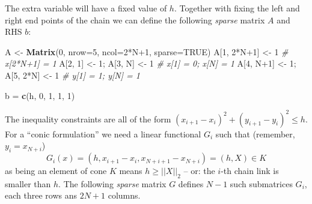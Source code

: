 \documentclass[]{article}
\newenvironment{Shaded}{\begin{snugshade}}{\end{snugshade}}
\newcommand{\KeywordTok}[1]{\textcolor[rgb]{0.13,0.29,0.53}{\textbf{{#1}}}}
\newcommand{\DataTypeTok}[1]{\textcolor[rgb]{0.13,0.29,0.53}{{#1}}}
\newcommand{\DecValTok}[1]{\textcolor[rgb]{0.00,0.00,0.81}{{#1}}}
\newcommand{\StringTok}[1]{\textcolor[rgb]{0.31,0.60,0.02}{{#1}}}
\newcommand{\CommentTok}[1]{\textcolor[rgb]{0.56,0.35,0.01}{\textit{{#1}}}}
\newcommand{\OtherTok}[1]{\textcolor[rgb]{0.56,0.35,0.01}{{#1}}}
\newcommand{\NormalTok}[1]{{#1}}
\begin{document}
The extra variable will have a fixed value of \(h\). Together with
fixing the left and right end points of the chain we can define the
following \emph{sparse} matrix \(A\) and RHS \(b\):

\begin{Shaded}
\begin{Highlighting}[]
\NormalTok{A <-}\StringTok{ }\KeywordTok{Matrix}\NormalTok{(}\DecValTok{0}\NormalTok{, }\DataTypeTok{nrow=}\DecValTok{5}\NormalTok{, }\DataTypeTok{ncol=}\DecValTok{2}\NormalTok{*N}\DecValTok{+1}\NormalTok{, }\DataTypeTok{sparse=}\OtherTok{TRUE}\NormalTok{)}
\NormalTok{A[}\DecValTok{1}\NormalTok{, }\DecValTok{2}\NormalTok{*N}\DecValTok{+1}\NormalTok{] <-}\StringTok{ }\DecValTok{1}                \CommentTok{# x[2*N+1] = 1}
\NormalTok{A[}\DecValTok{2}\NormalTok{, }\DecValTok{1}\NormalTok{] <-}\StringTok{ }\DecValTok{1}\NormalTok{; A[}\DecValTok{3}\NormalTok{, N] <-}\StringTok{ }\DecValTok{1}      \CommentTok{# x[1] = 0; x[N] = 1}
\NormalTok{A[}\DecValTok{4}\NormalTok{, N}\DecValTok{+1}\NormalTok{] <-}\StringTok{ }\DecValTok{1}\NormalTok{; A[}\DecValTok{5}\NormalTok{, }\DecValTok{2}\NormalTok{*N] <-}\StringTok{ }\DecValTok{1}  \CommentTok{# y[1] = 1; y[N] = 1}

\NormalTok{b =}\StringTok{ }\KeywordTok{c}\NormalTok{(h, }\DecValTok{0}\NormalTok{, }\DecValTok{1}\NormalTok{, }\DecValTok{1}\NormalTok{, }\DecValTok{1}\NormalTok{)}
\end{Highlighting}
\end{Shaded}

The inequality constraints are all of the form
\((x_{i+1}-x_i)^2 + (y_{i+1}-y_i)^2 \le h\). For a ``conic formulation''
we need a linear functional \(G_i\) such that (remember,
\(y_i = x_{N+i}\)) \[
    G_i(x) = (h, x_{i+1}-x_i, x_{N+i+1}-x_{N+i}) = (h, X) \in K
\] as being an element of cone \(K\) means \(h \ge ||X||_2\) -- or: the
\(i\)-th chain link is smaller than \(h\). The following \emph{sparse}
matrix \(G\) defines \(N-1\) such submatrices \(G_i\), each three rows
ans \(2N+1\) columns.
\end{document}
